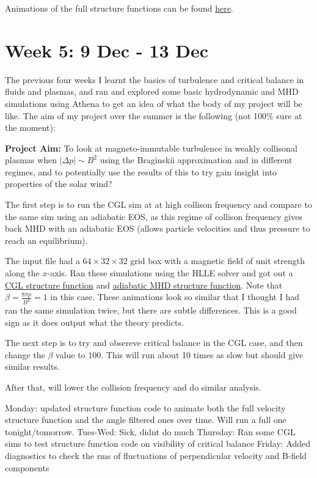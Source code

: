 \documentclass[12pt,letterpaper]{article}
\begin{document}
  Animations of the full structure functions can be found \href{https://github.com/JohnstonZade/python_tools/tree/master/animate}{here}.

  \newpage
  \section*{Week 5: 9 Dec - 13 Dec}

  The previous four weeks I learnt the basics of turbulence and critical balance in fluids and plasmas, and ran and explored some basic hydrodynamic and MHD simulations using Athena to get an idea of what the body of my project will be like. The aim of my project over the summer is the following (not 100\% sure at the moment):

  \textbf{Project Aim:} To look at magneto-immutable turbulence in weakly collisonal plasmas when $|\Delta p|\sim B^2$ using the Braginskii approximation and in different regimes, and to potentially use the results of this to try gain insight into properties of the solar wind?

  The first step is to run the CGL sim at at high collison frequency and compare to the same sim using an adiabatic EOS, as this regime of collison frequency gives back MHD with an adiabatic EOS (allows particle velocities and thus pressure to reach an equilibrium).

  The input file had a $64\times 32\times 32$ grid box with a magnetic field of unit strength along the $x$-axis. Ran these simulations using the HLLE solver and got out a \href{https://github.com/JohnstonZade/python_tools/blob/master/animate/cgl_cont_turb_6432.gif}{CGL structure function} and \href{https://github.com/JohnstonZade/python_tools/blob/master/animate/mhd_cont_turb_6432.gif}{adiabatic MHD structure function}. Note that $\beta = \frac{8\pi p}{B^2} = 1$ in this case. These animations look so similar that I thought I had ran the same simulation twice, but there are subtle differences. This is a good sign as it does output what the theory predicts.

  The next step is to try and obsereve critical balance in the CGL case, and then change the $\beta$ value to $100$. This will run about 10 times as slow but should give similar results.

  After that, will lower the collision frequency and do similar analysis.


  Monday: updated structure function code to animate both the full velocity structure function and the angle filtered ones over time. Will run a full one tonight/tomorrow.
  Tues-Wed: Sick, didnt do much
  Thursday: Ran some CGL sims to test structure function code on visibility of critical balance
  Friday: Added diagnostics to check the rms of fluctuations of perpendicular velocity and B-field components
\end{document}
